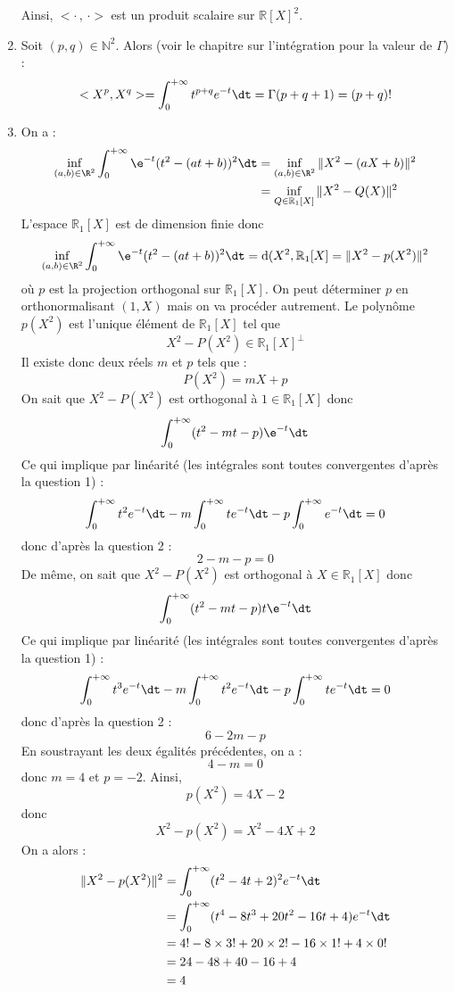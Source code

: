 \documentclass[a4paper,10pt]{report}
\begin{document}
\begin{enumerate}
\noindent Ainsi, $< \cdot \, , \, \cdot>$ est un produit scalaire sur $\mathbb{R}[X]^2$.
\item Soit $(p,q) \in \mathbb{N}^2$. Alors (voir le chapitre sur l'intégration pour la valeur de $\Gamma$) :
$$<X^p,X^q> = \int_0^{+ \infty} t^{p+q} e^{-t} \dt = \Gamma(p+q+1) = (p+q)!$$
\item  On a :
\begin{align*}
    \inf_{(a,b) \in \R^{2}} \int_{0}^{ + \infty} \e^{ - t}(t^{2} - (at + b))^{2} \dt&  =   \inf_{(a,b) \in \R^{2}} \Vert X^2-(aX+b)\Vert^2\\
    &  =   \inf_{Q \in \mathbb{R}_1[X]} \Vert X^2-Q(X) \Vert^2 
 \end{align*}
 L'espace $\mathbb{R}_1[X]$ est de dimension finie donc 
 $$  \inf_{(a,b) \in \R^{2}} \int_{0}^{ + \infty} \e^{ - t}(t^{2} - (at + b))^{2} \dt = \textrm{d}(X^2, \mathbb{R}_1[X] = \Vert X^2-p(X^2) \Vert^2$$
 où $p$ est la projection orthogonal sur $\mathbb{R}_1[X]$. On peut déterminer $p$ en orthonormalisant $(1,X)$ mais on va procéder autrement. Le polynôme $p(X^2)$ est l'unique élément de $\mathbb{R}_1[X]$ tel que 
 $$ X^2-P(X^2) \in \mathbb{R}_1[X]^{\perp}$$
 Il existe donc deux réels $m$ et $p$ tels que :
 $$ P(X^2) = mX+p$$
 On sait que $X^2-P(X^2)$ est orthogonal à $1 \in \mathbb{R}_1[X]$ donc 
 $$ \int_{0}^{ + \infty} (t^2-mt-p) \e^{ - t} \dt$$
 Ce qui implique par linéarité (les intégrales sont toutes convergentes d'après la question 1) :
 $$ \int_{0}^{ + \infty}  t^2 e^{-t} \dt - m \int_{0}^{ + \infty}  t e^{-t} \dt -p \int_{0}^{ + \infty}   e^{-t} \dt =0$$
 donc d'après la question 2 :
 $$ 2-m-p=0$$
 De même, on sait que $X^2-P(X^2)$ est orthogonal à $X \in \mathbb{R}_1[X]$ donc 
 $$ \int_{0}^{ + \infty} (t^2-mt-p)t \e^{ - t} \dt$$
 Ce qui implique par linéarité (les intégrales sont toutes convergentes d'après la question 1) :
 $$ \int_{0}^{ + \infty}  t^3 e^{-t} \dt - m \int_{0}^{ + \infty}  t^2 e^{-t} \dt -p \int_{0}^{ + \infty}  t e^{-t} \dt =0$$
 donc d'après la question 2 :
 $$ 6-2m-p$$
 En soustrayant les deux égalités précédentes, on a :
 $$ 4-m=0$$
 donc $m=4$ et $p=-2$. Ainsi,
 $$ p(X^2) = 4X-2$$
 donc
 $$ X^2-p(X^2) = X^2-4X+2$$
 On a alors :
 \begin{align*}
 \Vert X^2-p(X^2) \Vert^2 & = \int_0^{+ \infty} (t^2-4t+2)^2 e^{-t} \dt \\
 & =  \int_0^{+ \infty} (t^4-8t^3+20t^2-16t+4) e^{-t} \dt \\
 & = 4!-8 \times 3!+20 \times 2!-16 \times 1! + 4 \times 0! \\
 & = 24 - 48+40-16+4 \\
 & = 4
 \end{align*}
\end{enumerate}
\end{document}
